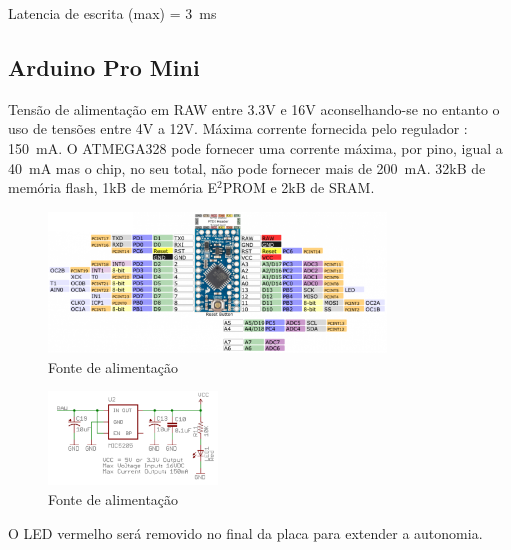 \documentclass{article}
\begin{document}
Latencia de escrita (max) = 3~ms

\subsection{Arduino Pro Mini}

Tensão de alimentação em RAW entre 3.3V e 16V aconselhando-se no entanto o uso de tensões entre 4V a 12V. Máxima corrente fornecida pelo regulador : 150~mA. O ATMEGA328 pode fornecer uma corrente máxima, por pino, igual a 40~mA mas o chip, no seu total, não pode fornecer mais de 200~mA. 32kB de memória flash, 1kB de memória E$^2$PROM e 2kB de SRAM.
\begin{figure}[htb!]
\centering
\includegraphics[width=0.8\textwidth]{Figuras/Fig25.png}
\caption{Fonte de alimentação}
\label{fig:fig15}
\end{figure}


\begin{figure}[htb!]
\centering
\includegraphics[width=0.4\textwidth]{Figuras/Fig23.png}
\caption{Fonte de alimentação}
\label{fig:fig15}
\end{figure}
O LED vermelho será removido no final da placa para extender a autonomia.
\end{document}
